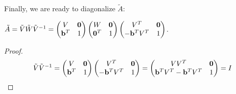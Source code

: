 Finally, we are ready to diagonalize $\tilde{A}$:
\begin{lemma}\label{lemma:5} $\tilde{A} = \tilde{V}\tilde{W}\tilde{V}^{-1} = \begin{pmatrix} V & \mathbf{0} \\ \mathbf{b}^T & 1\end{pmatrix} \begin{pmatrix} W & \mathbf{0} \\ \mathbf{0}^T & 1\end{pmatrix} \begin{pmatrix}V^T & \mathbf{0} \\- \mathbf{b}^T V^T & 1\end{pmatrix}$.\end{lemma}

\begin{proof}$$\tilde{V}\tilde{V}^{-1} = \begin{pmatrix} 
V & \mathbf{0} \\ 
\mathbf{b}^T & 1\end{pmatrix} \begin{pmatrix}
V^T & \mathbf{0} \\
- \mathbf{b}^T V^T & 1\end{pmatrix} = \begin{pmatrix}
VV^T & \mathbf{0} \\
\mathbf{b}^TV^T - \mathbf{b}^T V^T & 1\end{pmatrix} = I$$\end{proof}

